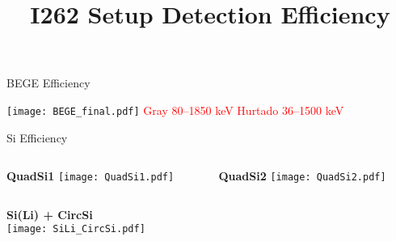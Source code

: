 \documentclass[10pt]{beamer}
\title{\normalsize I262 Setup Detection Efficiency}
\institute{}
\author{}
\date{}
\begin{document}
\frame{\titlepage}

\begin{frame}{BEGE Efficiency}
	
	\texttt{[image: BEGE\_final.pdf]}
	\small
	\textcolor{red}{Gray 80–1850 keV \hfill  Hurtado 36–1500 keV}

\end{frame}


\begin{frame}{Si Efficiency}
	\vspace{-0.1\textheight}
	\begin{columns}
		\begin{column}{0.5\textwidth}
			\begin{overlayarea}{\textwidth}{0.5\textheight}
				\centering
				\textbf{QuadSi1}
				\vspace{-0.05\textheight}
				\texttt{[image: QuadSi1.pdf]}
			\end{overlayarea}
		\end{column}
		\begin{column}{0.5\textwidth}
			\begin{overlayarea}{\textwidth}{0.5\textheight}
				\centering
				\textbf{QuadSi2}
				\vspace{-0.05\textheight}
				\texttt{[image: QuadSi2.pdf]}
			\end{overlayarea}
		\end{column}
	\end{columns}	
	\centering
	\textbf{Si(Li) + CircSi}\\
	\texttt{[image: SiLi\_CircSi.pdf]}

\end{frame}
\end{document}
